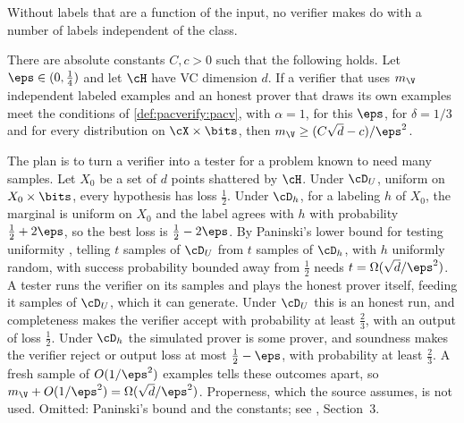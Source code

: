\begin{refsection}
Without labels that are a function of the input, no verifier makes do with a number of labels independent of the class.

\begin{theorem}\label{thm:pacverify:sqrtd}
There are absolute constants $C,c>0$ such that the following holds. Let $\eps\in(0,\frac14)$ and let $\cH$ have VC dimension $d$. If a verifier that uses $m_{\V}$ independent labeled examples and an honest prover that draws its own examples meet the conditions of \cref{def:pacverify:pacv}, with $\alpha=1$, for this $\eps$, for $\delta=1/3$ and for every distribution on $\cX\times\bits$, then $m_{\V}\ge(C\sqrt d-c)/\eps^2$.
\end{theorem}

\begin{proofsketch}
The plan is to turn a verifier into a tester for a problem known to need many samples. Let $X_0$ be a set of $d$ points shattered by $\cH$. Under $\cD_U$, uniform on $X_0\times\bits$, every hypothesis has loss $\frac12$. Under $\cD_h$, for a labeling $h$ of $X_0$, the marginal is uniform on $X_0$ and the label agrees with $h$ with probability $\frac12+2\eps$, so the best loss is $\frac12-2\eps$. By Paninski's lower bound for testing uniformity \parencite{Paninski2008}, telling $t$ samples of $\cD_U$ from $t$ samples of $\cD_h$, with $h$ uniformly random, with success probability bounded away from $\frac12$ needs $t=\Omega(\sqrt d/\eps^2)$. A tester runs the verifier on its samples and plays the honest prover itself, feeding it samples of $\cD_U$, which it can generate. Under $\cD_U$ this is an honest run, and completeness makes the verifier accept with probability at least $\frac23$, with an output of loss $\frac12$. Under $\cD_h$ the simulated prover is some prover, and soundness makes the verifier reject or output loss at most $\frac12-\eps$, with probability at least $\frac23$. A fresh sample of $O(1/\eps^2)$ examples tells these outcomes apart, so $m_{\V}+O(1/\eps^2)=\Omega(\sqrt d/\eps^2)$. Properness, which the source assumes, is not used. Omitted: Paninski's bound and the constants; see \textcite{MutrejaShafer2023}, Section~3.
\end{proofsketch}


\end{refsection}
